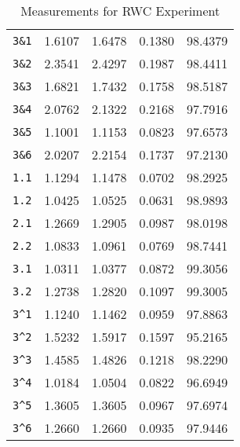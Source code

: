 \begin{table}[htb]
\begin{tabular}{lllll}
      \texttt{3\&1} & 1.6107 & 1.6478 & 0.1380 & 98.4379 \\
      \texttt{3\&2} & 2.3541 & 2.4297 & 0.1987 & 98.4411 \\
      \texttt{3\&3} & 1.6821 & 1.7432 & 0.1758 & 98.5187 \\
      \texttt{3\&4} & 2.0762 & 2.1322 & 0.2168 & 97.7916 \\
      \texttt{3\&5} & 1.1001 & 1.1153 & 0.0823 & 97.6573 \\
      \texttt{3\&6} & 2.0207 & 2.2154 & 0.1737 & 97.2130 \\
      \texttt{1.1} & 1.1294 & 1.1478 & 0.0702 & 98.2925 \\
      \texttt{1.2} & 1.0425 & 1.0525 & 0.0631 & 98.9893 \\
      \texttt{2.1} & 1.2669 & 1.2905 & 0.0987 & 98.0198 \\
      \texttt{2.2} & 1.0833 & 1.0961 & 0.0769 & 98.7441 \\
      \texttt{3.1} & 1.0311 & 1.0377 & 0.0872 & 99.3056 \\
      \texttt{3.2} & 1.2738 & 1.2820 & 0.1097 & 99.3005 \\
      \texttt{3\textasciicircum1} & 1.1240 & 1.1462 & 0.0959 & 97.8863 \\
      \texttt{3\textasciicircum2} & 1.5232 & 1.5917 & 0.1597 & 95.2165 \\
      \texttt{3\textasciicircum3} & 1.4585 & 1.4826 & 0.1218 & 98.2290 \\
      \texttt{3\textasciicircum4} & 1.0184 & 1.0504 & 0.0822 & 96.6949 \\
      \texttt{3\textasciicircum5} & 1.3605 & 1.3605 & 0.0967 & 97.6974 \\
      \texttt{3\textasciicircum6} & 1.2660 & 1.2660 & 0.0935 & 97.9446 \\
    \bottomrule
  \end{tabular}
  \caption{%
    Measurements for RWC Experiment
  }
  \label{tab:Packages}
\end{table}
%
